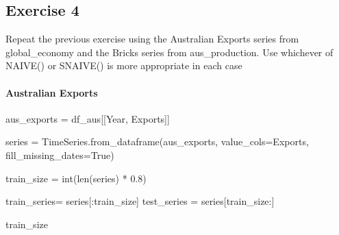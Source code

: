 \documentclass[
  11pt,
]{article}
\let\oldparagraph\paragraph
\renewcommand{\paragraph}[1]{\oldparagraph{#1}\mbox{}}
\newenvironment{Shaded}{\begin{snugshade}}{\end{snugshade}}
\newcommand{\BuiltInTok}[1]{\textcolor[rgb]{0.00,0.23,0.31}{#1}}
\newcommand{\FloatTok}[1]{\textcolor[rgb]{0.68,0.00,0.00}{#1}}
\newcommand{\NormalTok}[1]{\textcolor[rgb]{0.00,0.23,0.31}{#1}}
\newcommand{\OperatorTok}[1]{\textcolor[rgb]{0.37,0.37,0.37}{#1}}
\newcommand{\StringTok}[1]{\textcolor[rgb]{0.13,0.47,0.30}{#1}}
\newcommand{\VariableTok}[1]{\textcolor[rgb]{0.07,0.07,0.07}{#1}}
\begin{document}
\subsection{Exercise 4}\label{exercise-4}

Repeat the previous exercise using the Australian Exports series from
global\_economy and the Bricks series from aus\_production. Use
whichever of NAIVE() or SNAIVE() is more appropriate in each case

\paragraph{Australian Exports}\label{australian-exports}

\begin{Shaded}
\begin{Highlighting}[]
\NormalTok{aus\_exports }\OperatorTok{=}\NormalTok{ df\_aus[[}\StringTok{\textquotesingle{}Year\textquotesingle{}}\NormalTok{, }\StringTok{\textquotesingle{}Exports\textquotesingle{}}\NormalTok{]]}
\end{Highlighting}
\end{Shaded}

\begin{Shaded}
\begin{Highlighting}[]
\NormalTok{series }\OperatorTok{=}\NormalTok{ TimeSeries.from\_dataframe(aus\_exports, value\_cols}\OperatorTok{=}\StringTok{\textquotesingle{}Exports\textquotesingle{}}\NormalTok{, fill\_missing\_dates}\OperatorTok{=}\VariableTok{True}\NormalTok{)}
\end{Highlighting}
\end{Shaded}

\begin{Shaded}
\begin{Highlighting}[]
\NormalTok{train\_size }\OperatorTok{=} \BuiltInTok{int}\NormalTok{(}\BuiltInTok{len}\NormalTok{(series) }\OperatorTok{*} \FloatTok{0.8}\NormalTok{)}

\NormalTok{train\_series}\OperatorTok{=}\NormalTok{ series[:train\_size]}
\NormalTok{test\_series }\OperatorTok{=}\NormalTok{ series[train\_size:]}
\end{Highlighting}
\end{Shaded}

\begin{Shaded}
\begin{Highlighting}[]
\NormalTok{train\_size}
\end{Highlighting}
\end{Shaded}
\end{document}

